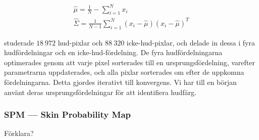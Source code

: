 \documentclass[../rapport_MVEX01-11-05]{subfiles}
\begin{document}
\begin{gather}
  \label{eq:hud:sigmamu}
  \hat\mu    =\frac{1}{N}-\sum_{i=1}^Nx_i\\
  \hat\Sigma =\frac{1}{N-1}\sum_{i=1}^N(x_i-\hat\mu)(x_i-\hat\mu)^T
\end{gather}

 studerade $18\:972$
hud-pixlar och $88\:320$ icke-hud-pixlar, och delade in dessa i fyra
hudfördelningar och en icke-hud-fördelning. De fyra hudfördelningarna
optimerades genom att varje pixel sorterades till en
ursprungsfördelning, varefter parametrarna uppdaterades, och alla
pixlar sorterades om efter de uppkomna fördelningarna. Detta gjordes
iterativt till konvergens. Vi har till en början använt deras
ursprungsfördelningar för att identifiera hudfärg.


\subsubsection{SPM --- Skin Probability Map}

Förklara?
\end{document}
